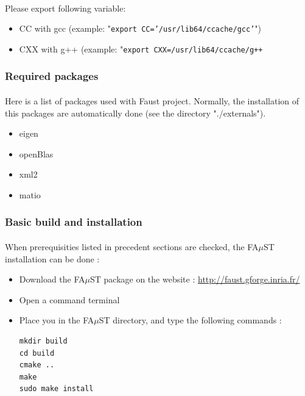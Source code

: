\paragraph{}Please export following variable:
\begin{itemize}
\item CC with gcc (example: "\texttt{export CC='/usr/lib64/ccache/gcc'}") 
\item CXX with g++ (example: "\texttt{export CXX=/usr/lib64/ccache/g++}
\end{itemize}

\subsubsection{Required packages}\label{sec:RequiredPackages}

\paragraph{}Here is a list of packages used with Faust project. Normally, the installation of this packages are automatically done (see the directory "./externals").
\begin{itemize}
\item eigen
\item openBlas
\item xml2
\item matio
\end{itemize}

\subsubsection{Basic build and installation}\label{sec:UnixBuildInstall}
\paragraph{}When prerequisities listed in precedent sections are checked, the FA$\mu$ST installation can be done : 

\begin{itemize}
\item Download the FA$\mu$ST package on the website :  \url{http://faust.gforge.inria.fr/}
\item Open a command terminal
\item Place you in the FA$\mu$ST directory, and type the following commands : 
\begin{lstlisting}
mkdir build
cd build
cmake ..
make
sudo make install
\end{lstlisting}
\end{itemize}

